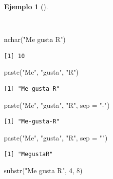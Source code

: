 \documentclass[
  a4paper,
]{scrreport}
\newenvironment{Shaded}{\begin{snugshade}}{\end{snugshade}}
\newcommand{\AttributeTok}[1]{\textcolor[rgb]{0.40,0.45,0.13}{#1}}
\newcommand{\DecValTok}[1]{\textcolor[rgb]{0.68,0.00,0.00}{#1}}
\newcommand{\FunctionTok}[1]{\textcolor[rgb]{0.28,0.35,0.67}{#1}}
\newcommand{\NormalTok}[1]{\textcolor[rgb]{0.00,0.23,0.31}{#1}}
\newcommand{\StringTok}[1]{\textcolor[rgb]{0.13,0.47,0.30}{#1}}
\theoremstyle{definition}
\theoremstyle{definition}
\newtheorem{example}{Ejemplo}[chapter]
\theoremstyle{remark}
\begin{document}
\begin{example}[]\protect\hypertarget{exm-operaciones-cadenas}{}\label{exm-operaciones-cadenas}

~

\begin{Shaded}
\begin{Highlighting}[]
\FunctionTok{nchar}\NormalTok{(}\StringTok{"Me gusta R"}\NormalTok{)}
\end{Highlighting}
\end{Shaded}

\begin{verbatim}
[1] 10
\end{verbatim}

\begin{Shaded}
\begin{Highlighting}[]
\FunctionTok{paste}\NormalTok{(}\StringTok{"Me"}\NormalTok{, }\StringTok{"gusta"}\NormalTok{, }\StringTok{"R"}\NormalTok{)}
\end{Highlighting}
\end{Shaded}

\begin{verbatim}
[1] "Me gusta R"
\end{verbatim}

\begin{Shaded}
\begin{Highlighting}[]
\FunctionTok{paste}\NormalTok{(}\StringTok{"Me"}\NormalTok{, }\StringTok{"gusta"}\NormalTok{, }\StringTok{"R"}\NormalTok{, }\AttributeTok{sep =} \StringTok{"{-}"}\NormalTok{)}
\end{Highlighting}
\end{Shaded}

\begin{verbatim}
[1] "Me-gusta-R"
\end{verbatim}

\begin{Shaded}
\begin{Highlighting}[]
\FunctionTok{paste}\NormalTok{(}\StringTok{"Me"}\NormalTok{, }\StringTok{"gusta"}\NormalTok{, }\StringTok{"R"}\NormalTok{, }\AttributeTok{sep =} \StringTok{""}\NormalTok{)}
\end{Highlighting}
\end{Shaded}

\begin{verbatim}
[1] "MegustaR"
\end{verbatim}

\begin{Shaded}
\begin{Highlighting}[]
\FunctionTok{substr}\NormalTok{(}\StringTok{"Me gusta R"}\NormalTok{, }\DecValTok{4}\NormalTok{, }\DecValTok{8}\NormalTok{)}
\end{Highlighting}
\end{Shaded}


\end{example}
\end{document}
